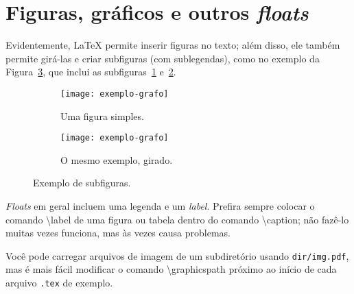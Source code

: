 \section{Figuras, gráficos e outros \emph{floats}}
\label{sec:exemplos-graficos}

Evidentemente, \LaTeX{} permite inserir figuras no texto; além disso, ele
também permite girá-las e criar subfiguras (com sublegendas),
como no exemplo da Figura~\ref{fig:subfigures}, que inclui
as subfiguras~\ref{fig:subfigures:a} e~\ref{fig:subfigures:b}.


\begin{figure}
  \centering

  \begin{subfigure}{0.4\textwidth}
    \centering
    \texttt{[image: exemplo-grafo]}
    \caption{Uma figura simples.\label{fig:subfigures:a}}
  \end{subfigure}
  \begin{subfigure}{0.4\textwidth}
    \centering
    \begin{turn}{90} %
      \texttt{[image: exemplo-grafo]}
    \end{turn}
    \caption{O mesmo exemplo, girado.\label{fig:subfigures:b}}
  \end{subfigure}

  \caption{Exemplo de subfiguras.\label{fig:subfigures}}
\end{figure}

\emph{Floats} em geral incluem uma legenda e um \emph{label}.
Prefira sempre colocar o comando \textsf{\textbackslash{}label} de uma
figura ou tabela dentro do comando \textsf{\textbackslash{}caption};
não fazê-lo muitas vezes funciona, mas às vezes causa problemas.

Você pode carregar arquivos de imagem de um subdiretório usando
\texttt{dir/img.pdf}, mas é mais fácil modificar o comando
\textsf{\textbackslash{}graphicspath} próximo ao início de cada
arquivo \texttt{.tex} de exemplo.

